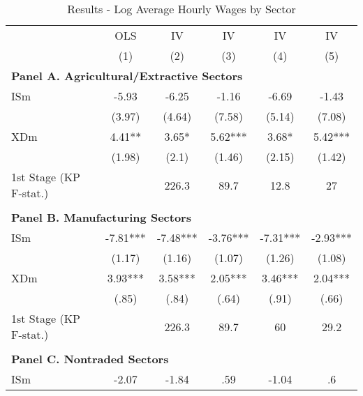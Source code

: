 \noindent \begin{center}
\begin{table}[h!]
\begin{center}
\protect\caption{\label{tab:Table_wages}Results - Log Average Hourly Wages by Sector}
\begin{centering}
\begin{tabular}{lccccc}
\hline 
 & {\footnotesize{}OLS } & {\footnotesize{}IV } & {\footnotesize{}IV } & {\footnotesize{}IV } & {\footnotesize{}IV }\tabularnewline
 & {\scriptsize{}(1)} & {\scriptsize{}(2)} & {\scriptsize{}(3)} & {\scriptsize{}(4)} & {\scriptsize{}(5)}\tabularnewline
\hline 
\multicolumn{6}{l}{\textbf{\footnotesize{}Panel A. Agricultural/Extractive Sectors}}\tabularnewline
{\footnotesize{}ISm} & {\footnotesize{} -5.93} & {\footnotesize{} -6.25} & {\footnotesize{} -1.16} & {\footnotesize{} -6.69} & {\footnotesize{} -1.43}\tabularnewline
 & {\scriptsize{}(3.97)} & {\scriptsize{}(4.64)} & {\scriptsize{}(7.58)} & {\scriptsize{}(5.14)} & {\scriptsize{}(7.08)}\tabularnewline
{\footnotesize{}XDm} & {\footnotesize{} 4.41**} & {\footnotesize{} 3.65*} & {\footnotesize{} 5.62***} & {\footnotesize{} 3.68*} & {\footnotesize{} 5.42***}\tabularnewline
 & {\scriptsize{}(1.98)} & {\scriptsize{}(2.1)} & {\scriptsize{}(1.46)} & {\scriptsize{}(2.15)} & {\scriptsize{}(1.42)}\tabularnewline
{\scriptsize{}1st Stage (KP F-stat.)} &  & {\scriptsize{} 226.3} & {\scriptsize{} 89.7} & {\scriptsize{} 12.8} & {\scriptsize{} 27}\tabularnewline
 &  &  &  &  & \tabularnewline
\multicolumn{6}{l}{\textbf{\footnotesize{}Panel B. Manufacturing Sectors}}\tabularnewline
{\footnotesize{}ISm} & {\footnotesize{} -7.81***} & {\footnotesize{} -7.48***} & {\footnotesize{} -3.76***} & {\footnotesize{} -7.31***} & {\footnotesize{} -2.93***}\tabularnewline
 & {\scriptsize{}(1.17)} & {\scriptsize{}(1.16)} & {\scriptsize{}(1.07)} & {\scriptsize{}(1.26)} & {\scriptsize{}(1.08)}\tabularnewline
{\footnotesize{}XDm} & {\footnotesize{} 3.93***} & {\footnotesize{} 3.58***} & {\footnotesize{} 2.05***} & {\footnotesize{} 3.46***} & {\footnotesize{} 2.04***}\tabularnewline
 & {\scriptsize{}(.85)} & {\scriptsize{}(.84)} & {\scriptsize{}(.64)} & {\scriptsize{}(.91)} & {\scriptsize{}(.66)}\tabularnewline
{\scriptsize{}1st Stage (KP F-stat.)} &  & {\scriptsize{} 226.3} & {\scriptsize{} 89.7} & {\scriptsize{} 60} & {\scriptsize{} 29.2}\tabularnewline
 &  &  &  &  & \tabularnewline
\multicolumn{6}{l}{\textbf{\footnotesize{}Panel C. Nontraded Sectors}}\tabularnewline
{\footnotesize{}ISm} & {\footnotesize{} -2.07} & {\footnotesize{} -1.84} & {\footnotesize{} .59} & {\footnotesize{} -1.04} & {\footnotesize{} .6}\tabularnewline

\end{tabular}
\end{centering}
\end{center}
\end{table}
\end{center}
